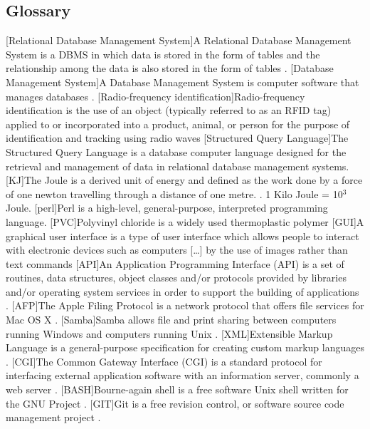 \documentclass[a4paper,10pt,twoside,headings=small,bibliography=totocnumbered,headsepline]{scrartcl}
\begin{document}
\begin{appendix}
\section{Glossary}
\begin{acronym}
[Relational Database Management System]{A Relational Database Management System is a \acs{DBMS} in which data is stored in the form of tables and the relationship among the data is also stored in the form of tables \cite{wiki:rdbms}.}
[Database Management System]{A Database Management System is computer software that manages databases \cite{wiki:dbms}.}
[Radio-frequency identification]{Radio-frequency identification is the use of an object (typically referred to as an RFID tag) applied to or incorporated into a product, animal, or person for the purpose of identification and tracking using radio waves \cite{wiki:rfid}}
[Structured Query Language]{The Structured Query Language is a database computer language designed for the retrieval and management of data in relational database management systems.\cite{wiki:sql}}
[KJ]{The Joule is a derived unit of energy and defined as the work done by a force of one newton travelling through a distance of one metre. \cite{wiki:joule}. 1 Kilo Joule = 10$^3$ Joule.}
[perl]{Perl is a high-level, general-purpose, interpreted programming language. \cite{wiki:perl}}
[PVC]{Polyvinyl chloride is a widely used thermoplastic polymer \cite{wiki:pvc}}
[GUI]{A graphical user interface is a type of user interface which allows people to interact with electronic devices such as computers [\ldots] by the use of images rather than text commands \cite{wiki:gui}}
[API]{An Application Programming Interface (API) is a set of routines, data structures, object classes and/or protocols provided by libraries and/or operating system services in order to support the building of applications \cite{wiki:api}.}
[AFP]{The Apple Filing Protocol is a network protocol that offers file services for Mac OS X \cite{wiki:afp}.}
[Samba]{Samba allows file and print sharing between computers running Windows and computers running Unix \cite{wiki:samba}.}
[XML]{Extensible Markup Language is a general-purpose specification for creating custom markup languages \cite{wiki:xml}.}
[CGI]{The Common Gateway Interface (CGI) is a standard protocol for interfacing external application software with an information server, commonly a web server \cite{wiki:cgi}.}
[BASH]{Bourne-again shell is a free software Unix shell written for the GNU Project \cite{wiki:bash}.}
[GIT]{Git is a free revision control, or software source code management project \cite{wiki:git}.}
\end{acronym}

\end{appendix}
\end{document}
